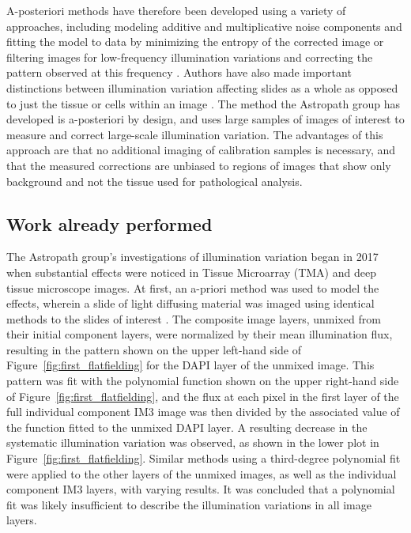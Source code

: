 \documentclass[letterpaper,11pt]{article}
\newcommand{\reffig}[1]{Figure~\ref{#1}}
\begin{document}
A-posteriori methods have therefore been developed using a variety of approaches, including modeling additive and multiplicative noise components and fitting the model to data by minimizing the entropy of the corrected image \cite{PMID:10692132} or filtering images for low-frequency illumination variations and correcting the pattern observed at this frequency \cite{Leong619}. Authors have also made important distinctions between illumination variation affecting slides as a whole as opposed to just the tissue or cells within an image \cite{Carpenter2006}. The method the Astropath group has developed is a-posteriori by design, and uses large samples of images of interest to measure and correct large-scale illumination variation. The advantages of this approach are that no additional imaging of calibration samples is necessary, and that the measured corrections are unbiased to regions of images that show only background and not the tissue used for pathological analysis.

\subsection{Work already performed}
\label{ssec:work_already_performed}

The Astropath group's investigations of illumination variation began in 2017 when substantial effects were noticed in Tissue Microarray (TMA) and deep tissue microscope images. At first, an a-priori method was used to model the effects, wherein a slide of light diffusing material was imaged using identical methods to the slides of interest \cite{Alex_flatfielding_1}. The composite image layers, unmixed from their initial component layers, were normalized by their mean illumination flux, resulting in the pattern shown on the upper left-hand side of \reffig{fig:first_flatfielding} for the DAPI layer of the unmixed image. This pattern was fit with the polynomial function shown on the upper right-hand side of \reffig{fig:first_flatfielding}, and the flux at each pixel in the first layer of the full individual component IM3 image was then divided by the associated value of the function fitted to the unmixed DAPI layer. A resulting decrease in the systematic illumination variation was observed, as shown in the lower plot in \reffig{fig:first_flatfielding}. Similar methods using a third-degree polynomial fit were applied to the other layers of the unmixed images, as well as the individual component IM3 layers, with varying results. It was concluded that a polynomial fit was likely insufficient to describe the illumination variations in all image layers.
\end{document}
